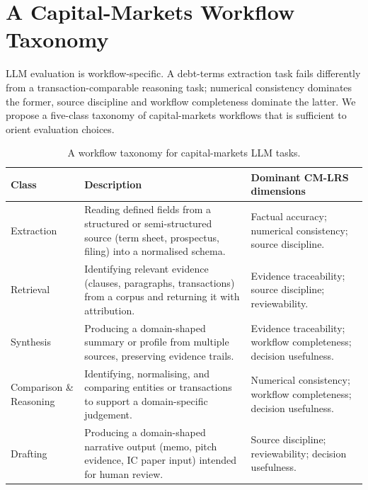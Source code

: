 \documentclass[11pt]{article}
\begin{document}
\section{A Capital-Markets Workflow Taxonomy}
\label{sec:taxonomy}

LLM evaluation is workflow-specific. A debt-terms extraction task fails differently from a transaction-comparable reasoning task; numerical consistency dominates the former, source discipline and workflow completeness dominate the latter. We propose a five-class taxonomy of capital-markets workflows that is sufficient to orient evaluation choices.

\begin{table}[h]
\centering
\caption{A workflow taxonomy for capital-markets LLM tasks.}
\label{tab:taxonomy}
\small
\renewcommand{\arraystretch}{1.2}
\begin{tabularx}{\textwidth}{@{}>{\raggedright\arraybackslash}p{}X>{\raggedright\arraybackslash}p{}@{}}
\toprule
\textbf{Class} & \textbf{Description} & \textbf{Dominant CM-LRS dimensions} \\
\midrule
Extraction & Reading defined fields from a structured or semi-structured source (term sheet, prospectus, filing) into a normalised schema. & Factual accuracy; numerical consistency; source discipline. \\
\addlinespace
Retrieval & Identifying relevant evidence (clauses, paragraphs, transactions) from a corpus and returning it with attribution. & Evidence traceability; source discipline; reviewability. \\
\addlinespace
Synthesis & Producing a domain-shaped summary or profile from multiple sources, preserving evidence trails. & Evidence traceability; workflow completeness; decision usefulness. \\
\addlinespace
Comparison \& Reasoning & Identifying, normalising, and comparing entities or transactions to support a domain-specific judgement. & Numerical consistency; workflow completeness; decision usefulness. \\
\addlinespace
Drafting & Producing a domain-shaped narrative output (memo, pitch evidence, IC paper input) intended for human review. & Source discipline; reviewability; decision usefulness. \\
\bottomrule
\end{tabularx}
\end{table}
\end{document}
